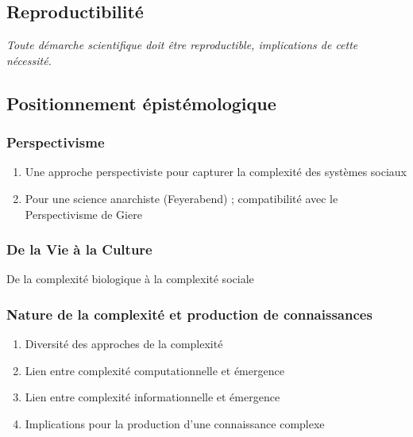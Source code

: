 \subsection{Reproductibilité}

\textit{Toute démarche scientifique doit être reproductible, implications de cette nécessité.}





\subsection{Positionnement épistémologique}

\subsubsection{Perspectivisme}

\begin{enumerate}
	\item Une approche perspectiviste pour capturer la complexité des systèmes sociaux
	\item Pour une science anarchiste (Feyerabend) ; compatibilité avec le Perspectivisme de Giere
\end{enumerate}

\subsubsection{De la Vie à la Culture}

De la complexité biologique à la complexité sociale


\subsubsection{Nature de la complexité et production de connaissances}

\begin{enumerate}
	\item Diversité des approches de la complexité
	\item Lien entre complexité computationnelle et émergence
	\item Lien entre complexité informationnelle et émergence
	\item Implications pour la production d'une connaissance complexe
\end{enumerate}





